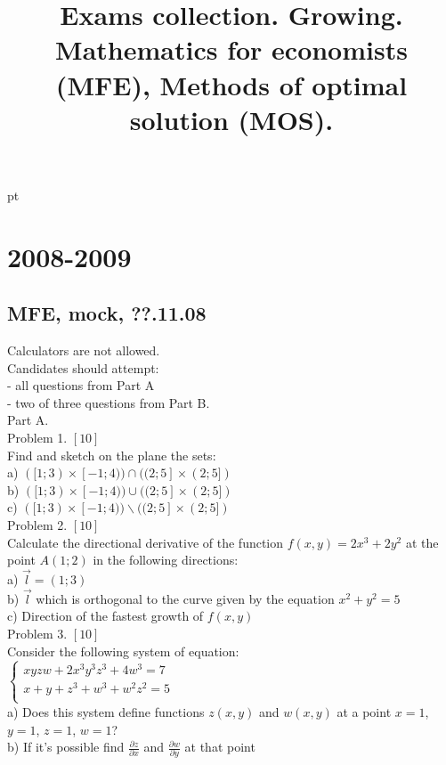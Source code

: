 \documentclass[pdftex,12pt,a4paper]{article}
\title{Exams collection. Growing. Mathematics for economists (MFE), Methods of optimal solution (MOS). }
\begin{document}
{} pt %

\maketitle

\tableofcontents{}

\section{2008-2009}

\subsection{MFE, mock, ??.11.08}

Calculators are not allowed. \\

Candidates should attempt:\\
- all questions from Part A \\
- two of three questions from Part B. \\


Part A. \\

Problem 1. $[10]$ \\
Find and sketch on the plane the sets:\\
a)	$([1;3)\times[-1;4))\cap ((2;5]\times(2;5])$\\
b)	$([1;3)\times[-1;4))\cup ((2;5]\times(2;5])$\\
c)	$([1;3)\times[-1;4))\backslash ((2;5]\times(2;5])$\\

Problem 2. $[10]$ \\
Calculate the directional derivative of the function $f(x,y)=2x^3+2y^2$ at the point $A(1;2)$ in the following directions:\\
a)	$\vec{l}=(1;3)$ \\
b)	$\vec{l}$ which is orthogonal to the curve given by the equation $x^2+y^2=5$\\
c)	Direction of the fastest growth of $f(x,y)$\\

Problem 3. $[10]$ \\
Consider the following system of equation:\\
$\left\{\begin{array}{l}
xyzw+2x^3y^3z^3+4w^3=7\\
x+y+z^3+w^3+w^2z^2=5\\
\end{array}\right.$\\
a)	Does this system define functions $z(x,y)$ and $w(x,y)$ at a point $x=1$, $y=1$, $z=1$, $w=1$?\\
b)	If it's possible find $\frac{\partial z}{\partial x}$ and $\frac{\partial w}{\partial y}$ at that point\\
\end{document}
